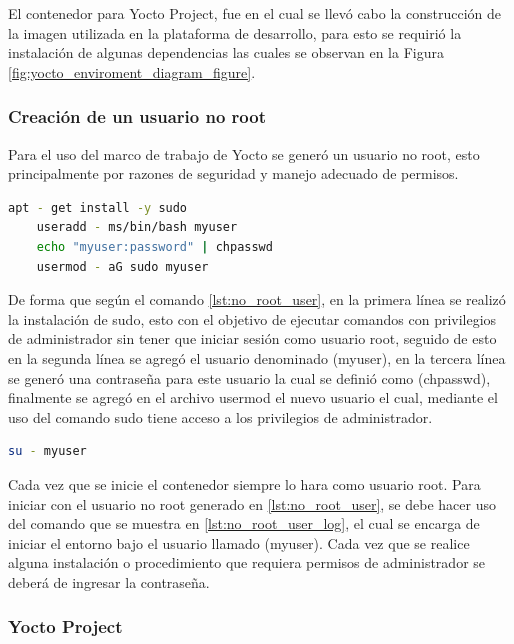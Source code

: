El contenedor para Yocto Project, fue en el cual se llevó cabo la construcción de la imagen utilizada en la plataforma de desarrollo, para esto se requirió la instalación de algunas dependencias las cuales se observan en la Figura \ref{fig:yocto_enviroment_diagram_figure}.



\subsubsection{Creación de un usuario no root}

Para el uso del marco de trabajo de Yocto se generó un usuario no root, esto principalmente por razones de seguridad y manejo adecuado de permisos.

\begin{lstlisting}[language=bash, caption={Generacion de usuario no root, Linux}, label=lst:no_root_user]
    apt - get install -y sudo
    useradd - ms/bin/bash myuser
    echo "myuser:password" | chpasswd
    usermod - aG sudo myuser
\end{lstlisting}

De forma que según el comando \ref{lst:no_root_user}, en la primera línea se realizó la instalación de sudo, esto con el objetivo de  ejecutar comandos con privilegios de administrador sin tener que iniciar sesión como usuario root, seguido de esto en la segunda línea se agregó el usuario denominado (myuser), en la tercera línea se generó una contraseña para este usuario la cual se definió como (chpasswd), finalmente se agregó en el archivo usermod el nuevo usuario el cual, mediante el uso del comando sudo tiene acceso a los privilegios de administrador. 

\begin{lstlisting}[language=bash, caption={Iniciar usuario no root, Linux}, label=lst:no_root_user_log]
    su - myuser
\end{lstlisting}

Cada vez que se inicie el contenedor siempre lo hara como usuario root. Para  iniciar con el usuario no root generado en \ref{lst:no_root_user}, se debe hacer uso del comando que se muestra en \ref{lst:no_root_user_log}, el cual se encarga de iniciar el entorno bajo el usuario llamado (myuser). Cada vez que se realice alguna instalación o procedimiento que requiera permisos de administrador se deberá de ingresar la contraseña.

\subsubsection{Yocto Project}

